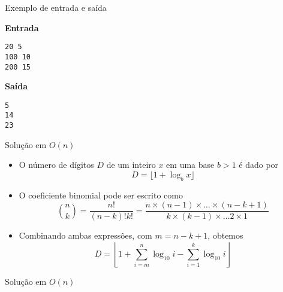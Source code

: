\begin{frame}[fragile]{Exemplo de entrada e saída}

\begin{minipage}[t]{0.45\textwidth}
\textbf{Entrada}
\begin{verbatim}
20 5
100 10
200 15
\end{verbatim}
\end{minipage}
\begin{minipage}[t]{0.5\textwidth}
\textbf{Saída}
\begin{verbatim}
5
14
23
\end{verbatim}
\end{minipage}

\end{frame}



\begin{frame}[fragile]{Solução em $O(n)$}

    \begin{itemize}
        \item O número de dígitos $D$ de um inteiro $x$ em uma base $b > 1$ é dado por
        $$
            D = \lfloor 1 + \log_b x\rfloor
        $$

        \item O coeficiente binomial pode ser escrito como
        $$
            \binom{n}{k} = \frac{n!}{(n - k)!k!} = \frac{n\times (n - 1)\times \ldots \times
                (n - k + 1)}{k\times (k - 1)\times \ldots 2 \times 1}
        $$

        \item Combinando ambas expressões, com $m = n - k + 1$, obtemos
        $$
            D = \left\lfloor 1 + \sum_{i = m}^n \log_{10} i - \sum_{i = 1}^k \log_{10} i \right\rfloor
        $$
    \end{itemize}

\end{frame}

\begin{frame}[fragile]{Solução em $O(n)$}
\end{frame}

